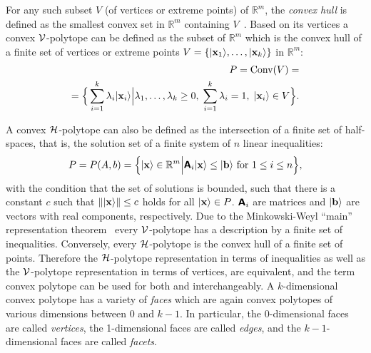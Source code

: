 \documentclass[%
  twocolumn,
 showpacs,
 showkeys,
 preprintnumbers,
 amsmath,amssymb,
 aps,
  pra,
  longbibliography,
 floatfix,
 ]{revtex4-1}
\begin{document}
For any such subset $V$ (of  vertices  or   extreme points)
of $\mathbb{R}^m$, the {\em convex hull}
is defined as the smallest convex set in $\mathbb{R}^m$
containing $V$~\cite[Sect.~2.10, p.~6]{Fukuda-techrep}.
Based on its vertices a convex ${\cal V}$-polytope can be defined as the subset of $\mathbb{R}^m$ which is the convex hull of a finite set of
vertices or extreme points
$V
=
\left\{
\vert  {\bf x}_1 \rangle , \ldots , \vert  {\bf x}_k \rangle
\right\}$ in $\mathbb{R}^m$:
\begin{equation}
\begin{split}
P=\text{Conv}(V) =
\\=\Big\{
\sum_{i=1}^k   \lambda_i \vert  {\bf x}_i \rangle
\Big|
\lambda_1, \ldots , \lambda_k  \ge 0 ,
\;
\sum_{i=1}^k   \lambda_i   = 1   ,
\;
\vert  {\bf x}_i \rangle \in V
\Big\}
.
\label{2017-b-V-polytope}
\end{split}
\end{equation}

A convex ${\cal H}$-polytope can also be defined as the intersection of a finite set of half-spaces,
that is, the solution set of a finite system of $n$ linear inequalities:
\begin{equation}
\begin{split}
P=P(A,b) =\Big\{
 \vert  {\bf x} \rangle \in \mathbb{R}^m
\Big|
\textsf{\textbf{A}}_i \vert {\bf x} \rangle   \le  \vert {\bf b} \rangle \text{ for } 1 \le i \le  n
\Big\}
,
\label{2017-b-H-polytope}
\end{split}
\end{equation}
with the condition that the set of solutions is bounded, such that there is a constant $c$ such that $\| \vert {\bf x} \rangle  \| \le c$ holds for
all $\vert {\bf x} \rangle  \in P$.   $\textsf{\textbf{A}}_i$ are matrices and $ \vert {\bf b} \rangle$ are  vectors with real  components, respectively.
Due to the Minkowski-Weyl ``main'' representation theorem~\cite{ziegler,Henk-Ziegler-polytopes,Avis:1997:GCH:280651.280652,mcmullen-71,Schrijver,gruenbaum-2003,Fukuda-techrep}
every ${\cal V}$-polytope has a description  by a finite set of inequalities.
Conversely,
every ${\cal H}$-polytope is the convex hull of a finite set of points.
Therefore the  ${\cal H}$-polytope representation in terms of inequalities  as well as the ${\cal V}$-polytope representation in terms of vertices,
are equivalent, and  the term convex polytope can be used for both and interchangeably.
A $k$-dimensional
convex polytope has  a variety of {\em faces} which are again convex polytopes of various dimensions between
0 and $k - 1$. In particular, the 0-dimensional faces are called {\em vertices}, the 1-dimensional faces
are called {\em edges}, and the $k - 1$-dimensional faces are called {\em facets}.
\end{document}
